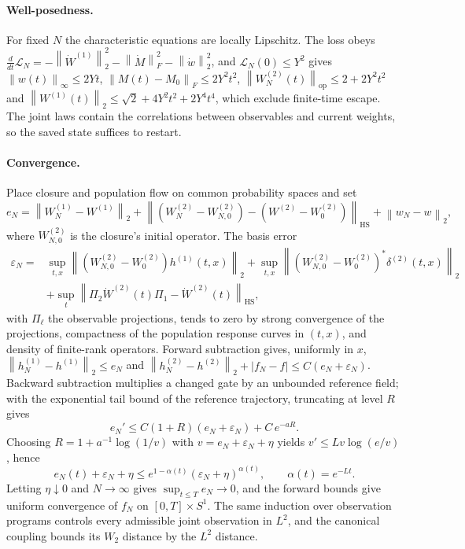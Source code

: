 \documentclass[11pt]{article}
\theoremstyle{definition}
\theoremstyle{remark}
\newcommand{\cL}{\mathcal{L}}
\newcommand{\norm}[1]{\left\lVert #1\right\rVert}
\newcommand{\HS}{\mathrm{HS}}
\begin{document}
\paragraph{Well-posedness.}
For fixed $N$ the characteristic equations are locally Lipschitz.  The loss
obeys $\frac{d}{dt}\cL_N=-\norm{\dot W^{(1)}}_2^2-\norm{\dot M}_F^2-\norm{\dot w}_2^2$,
and $\cL_N(0)\le Y^2$ gives $\norm{w(t)}_\infty\le2Yt$,
$\norm{M(t)-M_0}_F\le2Y^2t^2$, $\norm{W^{(2)}_N(t)}_{\mathrm{op}}\le2+2Y^2t^2$ and
$\norm{W^{(1)}(t)}_2\le\sqrt2+4Y^2t^2+2Y^4t^4$, which exclude finite-time escape.
The joint laws contain the correlations between observables and current weights,
so the saved state suffices to restart.

\paragraph{Convergence.}
Place closure and population flow on common probability spaces and set
\[
 e_N=\norm{W^{(1)}_N-W^{(1)}}_2
 +\norm{(W^{(2)}_N-W^{(2)}_{N,0})-(W^{(2)}-W^{(2)}_0)}_\HS
 +\norm{w_N-w}_2 ,
\]
where $W^{(2)}_{N,0}$ is the closure's initial operator.  The basis error
\begin{align*}
 \varepsilon_N={}&\sup_{t,x}\norm{(W^{(2)}_{N,0}-W^{(2)}_0)h^{(1)}(t,x)}_2
 +\sup_{t,x}\norm{(W^{(2)}_{N,0}-W^{(2)}_0)^*\delta^{(2)}(t,x)}_2\\
 &+\sup_t\norm{\Pi_2\dot W^{(2)}(t)\Pi_1-\dot W^{(2)}(t)}_\HS,
\end{align*}
with $\Pi_\ell$ the observable projections, tends to zero by strong convergence
of the projections, compactness of the population response curves in $(t,x)$,
and density of finite-rank operators.  Forward subtraction gives, uniformly in
$x$, $\norm{h^{(1)}_N-h^{(1)}}_2\le e_N$ and
$\norm{h^{(2)}_N-h^{(2)}}_2+|f_N-f|\le C(e_N+\varepsilon_N)$.  Backward
subtraction multiplies a changed gate by an unbounded reference field; with the
exponential tail bound of the reference trajectory, truncating at level $R$
gives
\[
 e_N'\le C(1+R)(e_N+\varepsilon_N)+C\,e^{-aR}.
\]
Choosing $R=1+a^{-1}\log(1/v)$ with $v=e_N+\varepsilon_N+\eta$ yields
$v'\le Lv\log(e/v)$, hence
\[
 e_N(t)+\varepsilon_N+\eta\le e^{1-\alpha(t)}(\varepsilon_N+\eta)^{\alpha(t)},
 \qquad\alpha(t)=e^{-Lt}.
\]
Letting $\eta\downarrow0$ and $N\to\infty$ gives $\sup_{t\le T}e_N\to0$, and the
forward bounds give uniform convergence of $f_N$ on $[0,T]\times S^1$.  The same
induction over observation programs controls every admissible joint observation
in $L^2$, and the canonical coupling bounds its $W_2$ distance by the $L^2$
distance.
\end{document}
